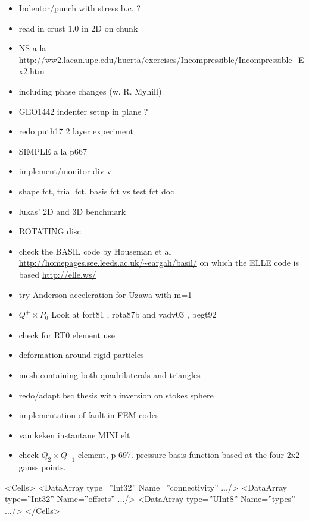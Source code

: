 \begin{itemize} 
\item Indentor/punch with stress b.c. ?
\item read in crust 1.0 in 2D on chunk
\item NS a la http://ww2.lacan.upc.edu/huerta/exercises/Incompressible/Incompressible\_Ex2.htm
\item including phase changes (w. R. Myhill)
\item GEO1442 indenter setup in plane ?
\item redo puth17 2 layer experiment
\item SIMPLE a la p667 \cite{john16} 
\item implement/monitor div v
\item shape fct, trial fct, basis fct vs test fct doc
\item lukas' 2D and 3D benchmark
\item ROTATING disc
\item check the BASIL code by Houseman et al \url{http://homepages.see.leeds.ac.uk/~eargah/basil/}
on which the ELLE code is based \url{http://elle.ws/} 
\item try Anderson acceleration for Uzawa \cite{hoow17} with m=1
\item $Q_1^+ \times P_0$ Look at fort81 , rota87b and vadv03 , begt92
\item check \cite{bufm19} for RT0 element use
\item deformation around rigid particles \cite{ilma93}
\item mesh containing both quadrilaterals and triangles \cite{anbr80}
\item redo/adapt bsc thesis with inversion on stokes sphere
\item implementation of fault in FEM codes \cite{zhgu94,zhgu95}
\item van keken instantane MINI elt
\item check $Q_2 \times Q_{-1}$ element, \cite{grsa} p 697. pressure basis function based at the four 2x2 gauss points.
\end{itemize}



<Cells>
<DataArray type=”Int32” Name=”connectivity” .../>
<DataArray type=”Int32” Name=”offsets” .../>
<DataArray type=”UInt8” Name=”types” .../>
</Cells>



